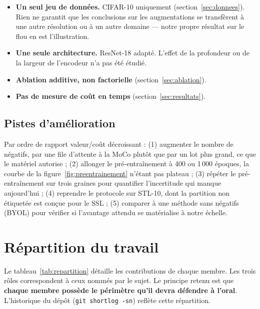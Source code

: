 \documentclass[11pt,a4paper]{article}
\begin{document}
\begin{itemize}
\item \textbf{Un seul jeu de données.} CIFAR-10 uniquement (section~\ref{sec:donnees}).
Rien ne garantit que les conclusions sur les augmentations se transfèrent à une autre
résolution ou à un autre domaine --- notre propre résultat sur le flou en est
l'illustration.
\item \textbf{Une seule architecture.} ResNet-18 adapté. L'effet de la profondeur ou de la
largeur de l'encodeur n'a pas été étudié.
\item \textbf{Ablation additive, non factorielle} (section~\ref{sec:ablation}).
\item \textbf{Pas de mesure de coût en temps} (section~\ref{sec:resultats}).
\end{itemize}

\subsection{Pistes d'amélioration}

Par ordre de rapport valeur/coût décroissant : (1) augmenter le nombre de négatifs, par une
file d'attente à la MoCo plutôt que par un lot plus grand, ce que le matériel autorise ;
(2) allonger le pré-entraînement à 400 ou 1\,000 époques, la courbe de la
figure~\ref{fig:preentrainement} n'étant pas plateau ; (3) répéter le pré-entraînement sur
trois graines pour quantifier l'incertitude qui manque aujourd'hui ; (4) reprendre le
protocole sur STL-10, dont la partition non étiquetée est conçue pour le SSL ; (5) comparer
à une méthode sans négatifs (BYOL) pour vérifier si l'avantage attendu se matérialise à
notre échelle.

\section{Répartition du travail}

Le tableau~\ref{tab:repartition} détaille les contributions de chaque membre. Les trois
rôles correspondent à ceux nommés par le sujet. Le principe retenu est que
\textbf{chaque membre possède le périmètre qu'il devra défendre à l'oral}. L'historique du
dépôt (\texttt{git shortlog -sn}) reflète cette répartition.
\end{document}

